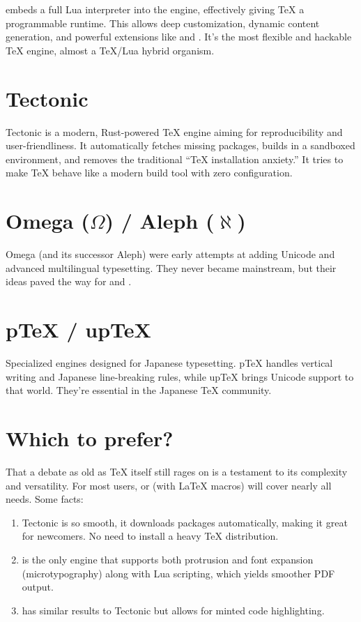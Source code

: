 \documentclass[a4paper,twoside]{article}
\begin{document}
\section{}
 embeds a full Lua interpreter into the engine, effectively giving \TeX{} a programmable runtime. This allows deep customization, dynamic content generation, and powerful extensions like  and . It's the most flexible and hackable \TeX{} engine, almost a \TeX{}/Lua hybrid organism.
\section{Tectonic}
Tectonic is a modern, Rust-powered \TeX{} engine aiming for reproducibility and user-friendliness. It automatically fetches missing packages, builds in a sandboxed environment, and removes the traditional ``\TeX{} installation anxiety.'' It tries to make \TeX{} behave like a modern build tool with zero configuration.
\section{Omega ($\Omega$) / Aleph ($\aleph$)}
Omega (and its successor Aleph) were early attempts at adding Unicode and advanced multilingual typesetting. They never became mainstream, but their ideas paved the way for  and .
\section{pTeX / upTeX}
Specialized engines designed for Japanese typesetting. pTeX handles vertical writing and Japanese line-breaking rules, while upTeX brings Unicode support to that world. They're essential in the Japanese \TeX{} community.
\section{Which to prefer?}
That a debate as old as \TeX{} itself still rages on is a testament to its complexity and versatility. For most users, \textbf{} or \textbf{} (with \LaTeX{} macros) will cover nearly all needs. Some facts:
\begin{enumerate}
\item Tectonic is so smooth, it downloads packages automatically, making it great for newcomers. No need to install a heavy \TeX{} distribution.
\item {} is the only engine that supports both protrusion and font expansion (microtypography) along with Lua scripting, which yields smoother PDF output.
\item {} has similar results to Tectonic but allows  for minted code highlighting.
\end{enumerate}
\end{document}

